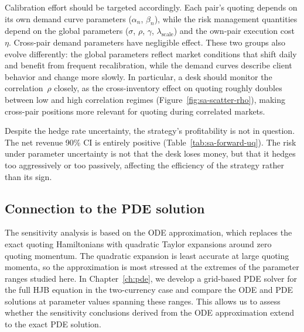 Calibration effort should be targeted accordingly. Each pair's quoting depends on its own demand curve parameters ($\alpha_n$, $\beta_n$), while the risk management quantities depend on the global parameters ($\sigma$, $\rho$, $\gamma$, $\lambda_{\text{scale}}$) and the own-pair execution cost~$\eta$. Cross-pair demand parameters have negligible effect. These two groups also evolve differently: the global parameters reflect market conditions that shift daily and benefit from frequent recalibration, while the demand curves describe client behavior and change more slowly. In particular, a desk should monitor the correlation~$\rho$ closely, as the cross-inventory effect on quoting roughly doubles between low and high correlation regimes (Figure~\ref{fig:sa-scatter-rho}), making cross-pair positions more relevant for quoting during correlated markets.

Despite the hedge rate uncertainty, the strategy's profitability is not in question. The net revenue 90\% CI is entirely positive (Table~\ref{tab:sa-forward-uq}). The risk under parameter uncertainty is not that the desk loses money, but that it hedges too aggressively or too passively, affecting the efficiency of the strategy rather than its sign.


\subsection{Connection to the PDE solution}
\label{sec:sa-bridge}

The sensitivity analysis is based on the ODE approximation, which replaces the exact quoting Hamiltonians with quadratic Taylor expansions around zero quoting momentum. The quadratic expansion is least accurate at large quoting momenta, so the approximation is most stressed at the extremes of the parameter ranges studied here. In Chapter~\ref{ch:pde}, we develop a grid-based PDE solver for the full HJB equation in the two-currency case and compare the ODE and PDE solutions at parameter values spanning these ranges. This allows us to assess whether the sensitivity conclusions derived from the ODE approximation extend to the exact PDE solution.
